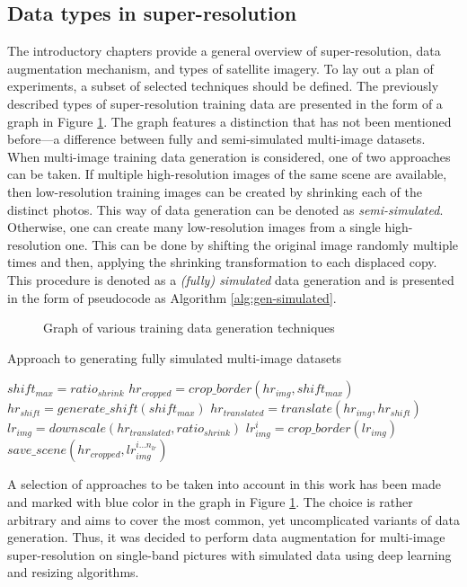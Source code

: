 \subsection{Data types in super-resolution}
The introductory chapters provide a general overview of super-resolution, data augmentation mechanism, and types of satellite imagery.
To lay out a plan of experiments, a subset of selected techniques should be defined.
The previously described types of super-resolution training data are presented in the form of a graph in Figure \ref{fig:image-types}.
The graph features a distinction that has not been mentioned before---a difference between fully and semi-simulated multi-image datasets.
When multi-image training data generation is considered, one of two approaches can be taken.
If multiple high-resolution images of the same scene are available, then low-resolution training images can be created by shrinking each of the distinct photos.
This way of data generation can be denoted as \textit{semi-simulated}.
Otherwise, one can create many low-resolution images from a single high-resolution one.
This can be done by shifting the original image randomly multiple times and then, applying the shrinking transformation to each displaced copy.
This procedure is denoted as a \textit{(fully) simulated} data generation and is presented in the form of pseudocode as Algorithm \ref{alg:gen-simulated}.
\begin{figure}
	\centering
    
    \caption{Graph of various training data generation techniques}
    \label{fig:image-types}
\end{figure}
\begin{algorithm}
\caption{Approach to generating fully simulated multi-image datasets}
\label{alg:gen-simulated}
\begin{algorithmic}
	\STATE $ shift_{max} = ratio_{shrink} $
		\STATE $ hr_{cropped} = crop\_border(hr_{img}, shift_{max}) $
			\STATE $ hr_{shift} = generate\_shift(shift_{max}) $
			\STATE $ hr_{translated} = translate(hr_{img}, hr_{shift}) $
			\STATE $ lr_{img} = downscale(hr_{translated}, ratio_{shrink}) $
			\STATE $ lr_{img}^{i} = crop\_border(lr_{img}) $
		\ENDFOR
		\STATE $ save\_scene(hr_{cropped}, lr_{img}^{i \dots n_{lr}}) $
	\ENDFOR
\end{algorithmic}
\end{algorithm}

A selection of approaches to be taken into account in this work has been made and marked with blue color in the graph in Figure \ref{fig:image-types}.
The choice is rather arbitrary and aims to cover the most common, yet uncomplicated variants of data generation.
Thus, it was decided to perform data augmentation for multi-image super-resolution on single-band pictures with simulated data using deep learning and resizing algorithms.

